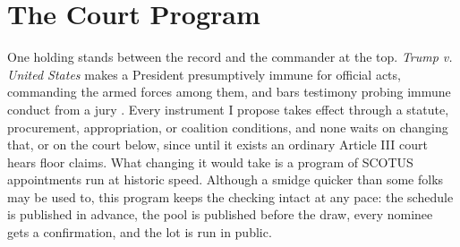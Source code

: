 \chapter{The Court Program}
\label{sec:D}
One holding stands between the record and the commander at the top. \emph{Trump v. United States} makes a President presumptively immune for official acts, commanding the armed forces among them, and bars testimony probing immune conduct from a jury \autocite{trump2024immunity}. Every instrument I propose takes effect through a statute, procurement, appropriation, or coalition conditions, and none waits on changing that, or on the court below, since until it exists an ordinary Article III court hears floor claims. What changing it would take is a program of SCOTUS appointments run at historic speed. Although a smidge quicker than some folks may be used to, this program keeps the checking intact at any pace: the schedule is published in advance, the pool is published before the draw, every nominee gets a confirmation, and the lot is run in public.


